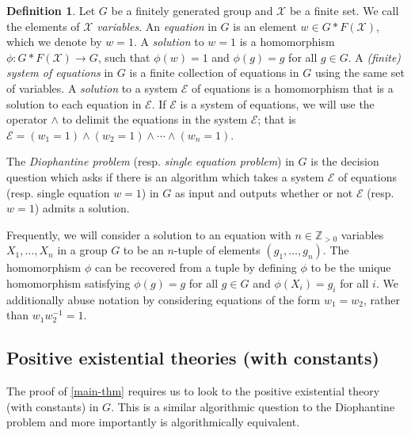 \documentclass[11pt]{amsart}
\theoremstyle{definition}
\newtheorem{dfn}[theorem]{Definition}
\numberwithin{theorem}{section}
\begin{document}
    \begin{dfn}
		Let \(G\) be a finitely generated group and \(\mathcal X\) be a finite
		set. We call the elements of \(\mathcal X\) \emph{variables}. An
		\emph{equation} in \(G\) is an element \(w \in G \ast F(\mathcal X)\),
		which we denote by \(w = 1\). A \emph{solution} to \(w = 1\) is a
		homomorphism \(\phi \colon G \ast F(\mathcal X) \to G\), such that
		\(\phi(w)  = 1\) and \(\phi (g)= g\) for all \(g \in G\).  A
		\emph{(finite) system of equations} in \(G\) is a finite collection of
		equations in \(G\) using the same set of variables. A \emph{solution}
		to a system \(\mathcal E\) of equations is a homomorphism that is a
		solution to each equation in \(\mathcal E\). If \(\mathcal E\) is a
		system of equations, we will use the operator \(\wedge\) to delimit the
		equations in the system \(\mathcal E\); that is \(\mathcal E = (w_1 =
		1) \wedge (w_2 = 1) \wedge \cdots \wedge (w_n = 1)\).

		The \emph{Diophantine problem} (resp. \emph{single equation problem})
		in \(G\) is the decision question which asks if there is an algorithm
		which takes a system \(\mathcal E\) of equations (resp. single equation
		\(w = 1\)) in \(G\) as input and outputs whether or not \(\mathcal E\)
		(resp. \(w = 1\)) admits a solution. 
	\end{dfn}

Frequently, we will consider a solution to an equation
		with \(n \in \mathbb{Z}_{>0}\) variables \(X_1, \ldots, X_n\) in a
		group \(G\) to be an \(n\)-tuple of elements \((g_1,  \ldots,  g_n)\).
		The homomorphism \(\phi\) can be recovered from a
		tuple by defining \(\phi\) to be the unique homomorphism satisfying
		\(\phi(g)  = g\) for all \(g \in G\) and \(\phi(X_i) = g_i\) for all
		\(i\). We additionally abuse notation by considering equations of the
		form \(w_1 = w_2\), rather than
		\(w_1w_2^{-1} = 1\).

\subsection{Positive existential theories (with constants)}

	The proof of \cref{main-thm} requires us to look to the positive existential
	theory (with constants) in \(G\). This is a similar algorithmic question to
	the Diophantine problem and more importantly is algorithmically equivalent.
\end{document}
